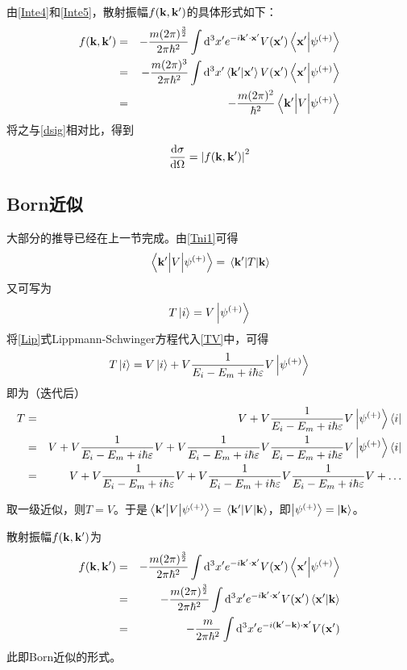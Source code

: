 \documentclass[hyperref]{ctexart}
\begin{document}
由\eqref{Inte4}和\eqref{Inte5}，散射振幅$f(\vb{k},\vb{k'})$的具体形式如下：
\begin{eqnarray}
  f(\vb{k},\vb{k'}) &=& -\frac{m(2\pi)^{\frac{3}{2}}}{2\pi\hbar^2}\int\dd^3x'e^{-i\vb{k'}\cdot\vb{x'}}V(\vb{x'})\braket{\vb{x'}}{\psi^{(+)}} \\
   &=& -\frac{m(2\pi)^3}{2\pi\hbar^2}\int\dd^3x'\braket{\vb{k'}}{\vb{x'}}V(\vb{x'})\braket{\vb{x'}}{\psi^{(+)}} \\
   \label{fkfinal}&=& -\frac{m(2\pi)^2}{\hbar^2}\mel{\vb{k'}}{V}{\psi^{(+)}}
\end{eqnarray}
将之与\eqref{dsig}相对比，得到
\begin{equation}\label{dsigf}
  \frac{\dd \sigma}{\dd\Omega}=\abs{f(\vb{k},\vb{k'})}^2
\end{equation}
\subsection{Born近似}
大部分的推导已经在上一节完成。由\eqref{Tni1}可得
\begin{equation}\label{T}
  \mel{\vb{k'}}{V}{\psi^{(+)}}=\mel{\vb{k'}}{T}{\vb{k}}
\end{equation}
又可写为
\begin{equation}\label{TV}
  T\ket{i}=V\ket{\psi^{(+)}}
\end{equation}
将\eqref{Lip}式Lippmann-Schwinger方程代入\eqref{TV}中，可得
\begin{equation}\label{TV1}
  T\ket{i}=V\ket{i}+V\frac{1}{E_i-E_m+i\hbar\varepsilon}{V}\ket{\psi^{(+)}}
\end{equation}
即为（迭代后）
\begin{eqnarray}
  T &=& V+V\frac{1}{E_i-E_m+i\hbar\varepsilon}{V}\ket{\psi^{(+)}}\bra{i} \\
   &=& V+V\frac{1}{E_i-E_m+i\hbar\varepsilon}{V}+V\frac{1}{E_i-E_m+i\hbar\varepsilon}V\frac{1}{E_i-E_m+i\hbar\varepsilon}{V}\ket{\psi^{(+)}}\bra{i} \\
   &=& V+V\frac{1}{E_i-E_m+i\hbar\varepsilon}{V}+V\frac{1}{E_i-E_m+i\hbar\varepsilon}V\frac{1}{E_i-E_m+i\hbar\varepsilon}{V}+\dots
\end{eqnarray}

取一级近似，则$T=V$。于是$\mel{\vb{k'}}{V}{\psi^{(+)}}=\mel{\vb{k'}}{V}{\vb{k}}$，即$\ket{\psi^{(+)}}=\ket{\vb{k}}$。

散射振幅$f(\vb{k},\vb{k'})$为
\begin{eqnarray}
  f(\vb{k},\vb{k'}) &=& -\frac{m(2\pi)^{\frac{3}{2}}}{2\pi\hbar^2}\int\dd^3x'e^{-i\vb{k'}\cdot\vb{x'}}V(\vb{x'})\braket{\vb{x'}}{\psi^{(+)}} \\
   &=& -\frac{m(2\pi)^{\frac{3}{2}}}{2\pi\hbar^2}\int\dd^3x'e^{-i\vb{k'}\cdot\vb{x'}}V(\vb{x'})\braket{\vb{x'}}{\vb{k}} \\
   &=& -\frac{m}{2\pi\hbar^2}\int\dd^3x'e^{-i(\vb{k'}-\vb{k})\cdot\vb{x'}}V(\vb{x'})
\end{eqnarray}
此即Born近似的形式。
\end{document}
